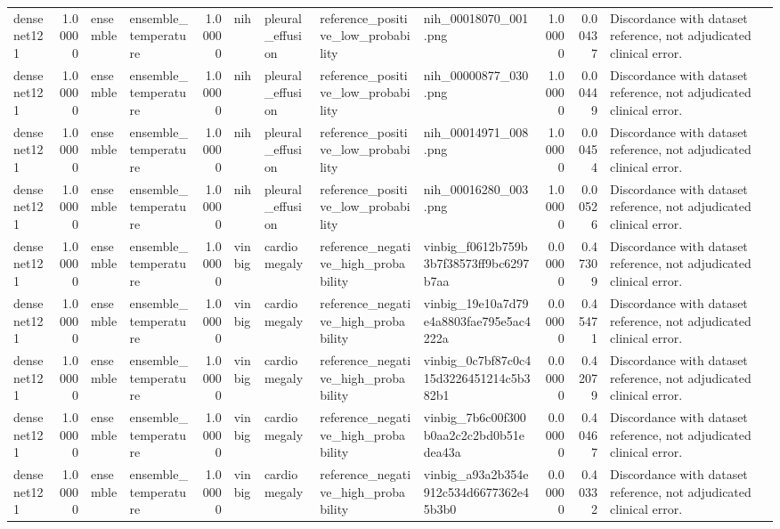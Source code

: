 \begin{tabular}{lrllrllllrrl}
densenet121 & 1.00000 & ensemble & ensemble\_temperature & 1.00000 & nih & pleural\_effusion & reference\_positive\_low\_probability & nih\_00018070\_001.png & 1.00000 & 0.00437 & Discordance with dataset reference, not adjudicated clinical error. \\
densenet121 & 1.00000 & ensemble & ensemble\_temperature & 1.00000 & nih & pleural\_effusion & reference\_positive\_low\_probability & nih\_00000877\_030.png & 1.00000 & 0.00449 & Discordance with dataset reference, not adjudicated clinical error. \\
densenet121 & 1.00000 & ensemble & ensemble\_temperature & 1.00000 & nih & pleural\_effusion & reference\_positive\_low\_probability & nih\_00014971\_008.png & 1.00000 & 0.00454 & Discordance with dataset reference, not adjudicated clinical error. \\
densenet121 & 1.00000 & ensemble & ensemble\_temperature & 1.00000 & nih & pleural\_effusion & reference\_positive\_low\_probability & nih\_00016280\_003.png & 1.00000 & 0.00526 & Discordance with dataset reference, not adjudicated clinical error. \\
densenet121 & 1.00000 & ensemble & ensemble\_temperature & 1.00000 & vinbig & cardiomegaly & reference\_negative\_high\_probability & vinbig\_f0612b759b3b7f38573ff9bc6297b7aa & 0.00000 & 0.47309 & Discordance with dataset reference, not adjudicated clinical error. \\
densenet121 & 1.00000 & ensemble & ensemble\_temperature & 1.00000 & vinbig & cardiomegaly & reference\_negative\_high\_probability & vinbig\_19e10a7d79e4a8803fae795e5ac4222a & 0.00000 & 0.45471 & Discordance with dataset reference, not adjudicated clinical error. \\
densenet121 & 1.00000 & ensemble & ensemble\_temperature & 1.00000 & vinbig & cardiomegaly & reference\_negative\_high\_probability & vinbig\_0c7bf87c0c415d3226451214c5b382b1 & 0.00000 & 0.42079 & Discordance with dataset reference, not adjudicated clinical error. \\
densenet121 & 1.00000 & ensemble & ensemble\_temperature & 1.00000 & vinbig & cardiomegaly & reference\_negative\_high\_probability & vinbig\_7b6c00f300b0aa2c2c2bd0b51edea43a & 0.00000 & 0.40467 & Discordance with dataset reference, not adjudicated clinical error. \\
densenet121 & 1.00000 & ensemble & ensemble\_temperature & 1.00000 & vinbig & cardiomegaly & reference\_negative\_high\_probability & vinbig\_a93a2b354e912c534d6677362e45b3b0 & 0.00000 & 0.40332 & Discordance with dataset reference, not adjudicated clinical error. \\

\end{tabular}
